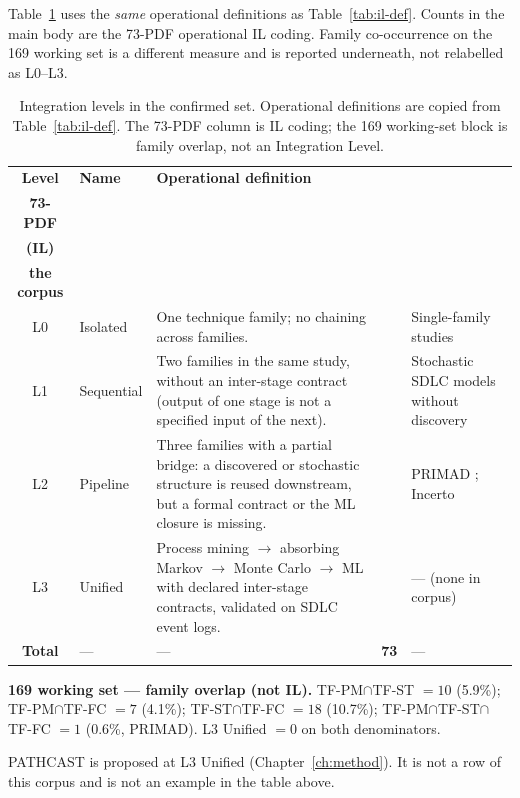 Table~\ref{tab:positioning} uses the \emph{same} operational definitions as
Table~\ref{tab:il-def}. Counts in the main body are the 73-PDF operational
IL coding. Family co-occurrence on the 169 working set is a different
measure and is reported underneath, not relabelled as L0--L3.

\begin{table}[htbp]
\centering
\begin{threeparttable}
\caption{Integration levels in the confirmed set. Operational definitions
are copied from Table~\ref{tab:il-def}. The 73-PDF column is IL coding;
the 169 working-set block is family overlap, not an Integration Level.}
\label{tab:positioning}
\footnotesize
\setlength{\tabcolsep}{3pt}
\renewcommand{\arraystretch}{1.08}
\begin{tabularx}{\linewidth}{@{}c l >{\raggedright\arraybackslash}X
    >{\centering\arraybackslash}p{1.35cm} >{\raggedright\arraybackslash}p{2.7cm}@{}}
\toprule
\textbf{Level} & \textbf{Name} & \textbf{Operational definition} &
  \makecell[c]{\textbf{$n$}\\\textbf{73-PDF}\\\textbf{(IL)}} &
  \makecell[l]{\textbf{Example in}\\\textbf{the corpus}} \\
\midrule
L0 & Isolated & One technique family; no chaining across families.
  & 13 & Single-family studies \\
L1 & Sequential & Two families in the same study, without an inter-stage
  contract (output of one stage is not a specified input of the next).
  & 54 & Stochastic SDLC models without discovery \\
L2 & Pipeline & Three families with a partial bridge: a discovered or
  stochastic structure is reused downstream, but a formal contract or the
  ML closure is missing.
  & 6 & PRIMAD \cite{guinea2025}; Incerto \cite{incerto2025} \\
L3 & Unified & Process mining $\rightarrow$ absorbing Markov $\rightarrow$
  Monte Carlo $\rightarrow$ ML with declared inter-stage contracts,
  validated on SDLC event logs.
  & 0 & --- (none in corpus)\tnote{a} \\
\midrule
\textbf{Total} & --- & --- & \textbf{73} & --- \\
\bottomrule
\end{tabularx}

\vspace{0.7em}
\noindent\textbf{169 working set --- family overlap (not IL).}
TF-PM$\cap$TF-ST $=10$ (5.9\%);
TF-PM$\cap$TF-FC $=7$ (4.1\%);
TF-ST$\cap$TF-FC $=18$ (10.7\%);
TF-PM$\cap$TF-ST$\cap$TF-FC $=1$ (0.6\%, PRIMAD).
L3 Unified $=0$ on both denominators.

\begin{tablenotes}[flushleft]
\footnotesize
\item[a] PATHCAST is proposed at L3 Unified
  (Chapter~\ref{ch:method}). It is not a row of this corpus and is not an
  example in the table above.
\end{tablenotes}
\end{threeparttable}
\end{table}

